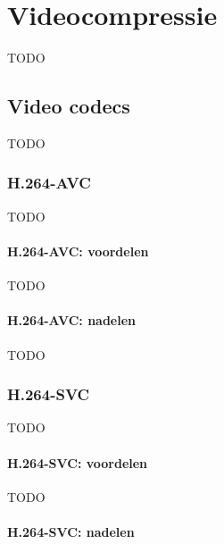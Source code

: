 \chapter{Videocompressie}
\label{ch:videocompressie}

TODO

\section{Video codecs}
\label{sec:videocompressie-video-codecs}

TODO

\subsection{H.264-AVC}
\label{sec:videocompressie-h264-AVC}

TODO

\subsubsection{H.264-AVC: voordelen}
\label{sec:videocompressie-h264-AVC-voordelen}

TODO

\subsubsection{H.264-AVC: nadelen}
\label{sec:videocompressie-h264-AVC-nadelen}

TODO

\subsection{H.264-SVC}
\label{sec:videocompressie-h264-SVC}

TODO

\subsubsection{H.264-SVC: voordelen}
\label{sec:videocompressie-h264-SVC-voordelen}

TODO

\subsubsection{H.264-SVC: nadelen}
\label{sec:videocompressie-h264-SVC-nadelen}

